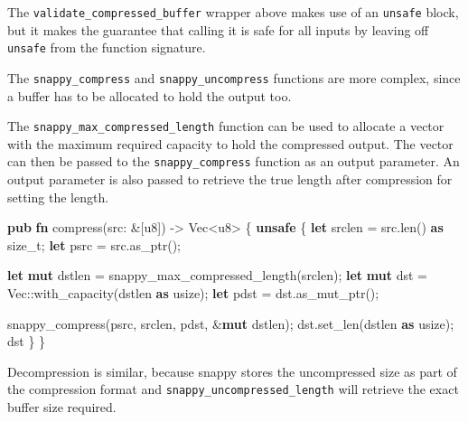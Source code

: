 \documentclass[a4paper,]{book}
\newenvironment{Shaded}{\begin{snugshade}}{\end{snugshade}}
\newcommand{\KeywordTok}[1]{\textcolor[rgb]{0.13,0.29,0.53}{\textbf{{#1}}}}
\newcommand{\DataTypeTok}[1]{\textcolor[rgb]{0.13,0.29,0.53}{{#1}}}
\newcommand{\NormalTok}[1]{{#1}}
\begin{document}
The \texttt{validate\_compressed\_buffer} wrapper above makes use of an
\texttt{unsafe} block, but it makes the guarantee that calling it is
safe for all inputs by leaving off \texttt{unsafe} from the function
signature.

The \texttt{snappy\_compress} and \texttt{snappy\_uncompress} functions
are more complex, since a buffer has to be allocated to hold the output
too.

The \texttt{snappy\_max\_compressed\_length} function can be used to
allocate a vector with the maximum required capacity to hold the
compressed output. The vector can then be passed to the
\texttt{snappy\_compress} function as an output parameter. An output
parameter is also passed to retrieve the true length after compression
for setting the length.

\begin{Shaded}
\begin{Highlighting}[]
\KeywordTok{pub} \KeywordTok{fn} \NormalTok{compress(src: &[}\DataTypeTok{u8}\NormalTok{]) -> }\DataTypeTok{Vec}\NormalTok{<}\DataTypeTok{u8}\NormalTok{> \{}
    \KeywordTok{unsafe} \NormalTok{\{}
        \KeywordTok{let} \NormalTok{srclen = src.len() }\KeywordTok{as} \DataTypeTok{size_t}\NormalTok{;}
        \KeywordTok{let} \NormalTok{psrc = src.as_ptr();}

        \KeywordTok{let} \KeywordTok{mut} \NormalTok{dstlen = snappy_max_compressed_length(srclen);}
        \KeywordTok{let} \KeywordTok{mut} \NormalTok{dst = }\DataTypeTok{Vec}\NormalTok{::with_capacity(dstlen }\KeywordTok{as} \DataTypeTok{usize}\NormalTok{);}
        \KeywordTok{let} \NormalTok{pdst = dst.as_mut_ptr();}

        \NormalTok{snappy_compress(psrc, srclen, pdst, &}\KeywordTok{mut} \NormalTok{dstlen);}
        \NormalTok{dst.set_len(dstlen }\KeywordTok{as} \DataTypeTok{usize}\NormalTok{);}
        \NormalTok{dst}
    \NormalTok{\}}
\NormalTok{\}}
\end{Highlighting}
\end{Shaded}

Decompression is similar, because snappy stores the uncompressed size as
part of the compression format and \texttt{snappy\_uncompressed\_length}
will retrieve the exact buffer size required.
\end{document}
